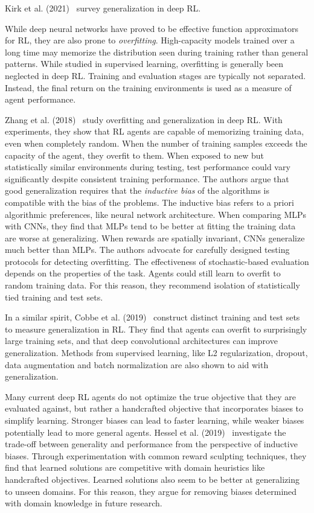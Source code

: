 Kirk et al. (2021)~\cite{kirk_survey_2022} survey generalization in deep RL.


While deep neural networks have proved to be effective function approximators for RL, they are also prone to \textit{overfitting}.
High-capacity models trained over a long time may memorize the distribution seen during training rather than general patterns.
While studied in supervised learning, overfitting is generally been neglected in deep RL.
Training and evaluation stages are typically not separated.
Instead, the final return on the training environments is used as a measure of agent performance.

Zhang et al. (2018)~\cite{zhang_overfitting_2018} study overfitting and generalization in deep RL.
With experiments, they show that RL agents are capable of memorizing training data, even when completely random.
When the number of training samples exceeds the capacity of the agent, they overfit to them.
When exposed to new but statistically similar environments during testing, test performance could vary significantly despite consistent training performance.
The authors argue that good generalization requires that the \textit{inductive bias} of the algorithms is compatible with the bias of the problems.
The inductive bias refers to a priori algorithmic preferences, like neural network architecture.
When comparing MLPs with CNNs, they find that MLPs tend to be better at fitting the training data are worse at generalizing.
When rewards are spatially invariant, CNNs generalize much better than MLPs.
The authors advocate for carefully designed testing protocols for detecting overfitting.
The effectiveness of stochastic-based evaluation depends on the properties of the task.
Agents could still learn to overfit to random training data. 
For this reason, they recommend isolation of statistically tied training and test sets.

In a similar spirit, Cobbe et al. (2019)~\cite{cobbe_generalization_2019} construct distinct training and test sets to measure generalization in RL.
They find that agents can overfit to surprisingly large training sets, and that deep convolutional architectures can improve generalization.
Methods from supervised learning, like L2 regularization, dropout, data augmentation and batch normalization are also shown to aid with generalization.

Many current deep RL agents do not optimize the true objective that they are evaluated against,
but rather a handcrafted objective that incorporates biases to simplify learning.
Stronger biases can lead to faster learning, while weaker biases potentially lead to more general agents.
Hessel et al. (2019)~\cite{hessel_inductive_2019} investigate the trade-off between generality and performance from the perspective of inductive biases.
Through experimentation with common reward sculpting techniques, they find that learned solutions are competitive with domain heuristics like handcrafted objectives.
Learned solutions also seem to be better at generalizing to unseen domains.
For this reason, they argue for removing biases determined with domain knowledge in future research.


